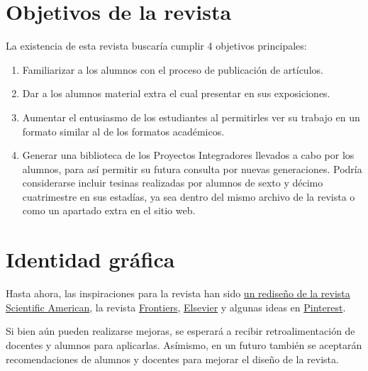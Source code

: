 \documentclass{Manual}
\begin{document}
    \frontmatter

\Portada
\Indice



    \mainmatter


\chapter{Objetivos de la revista}

La existencia de esta revista buscaría cumplir 4 objetivos principales:

\begin{enumerate}
    \item Familiarizar a los alumnos con el proceso de publicación de artículos.
    \item Dar a los alumnos material extra el cual presentar en sus exposiciones.
    \item Aumentar el entusiasmo de los estudiantes al permitirles ver su trabajo en un formato similar al de los formatos académicos.
    \item Generar una biblioteca de los Proyectos Integradores llevados a cabo por los alumnos, para así permitir su futura consulta por nuevas generaciones.
        \subitem Podría considerarse incluir tesinas realizadas por alumnos de sexto y décimo cuatrimestre en sus estadías, ya sea dentro del mismo archivo de la revista o como un apartado extra en el sitio web.
\end{enumerate}



\chapter{Identidad gráfica}

Hasta ahora, las inspiraciones para la revista han sido \href{https://www.pentagram.com/work/scientific-american?rel=sector&rel-id=3}{un rediseño de la revista Scientific American}, la revista \href{https://www.frontiersin.org/journals/sustainability/articles/10.3389/frsus.2026.1818134/pdf}{Frontiers}, \href{https://www.sciencedirect.com/science/article/pii/S1198743X26000650/pdfft?pid=1-s2.0-S1198743X26000650-main.pdf}{Elsevier} y algunas ideas en \href{https://pin.it/3s68QTUbZ}{Pinterest}.

Si bien aún pueden realizarse mejoras, se esperará a recibir retroalimentación de docentes y alumnos para aplicarlas. Asímismo, en un futuro también se aceptarán recomendaciones de alumnos y docentes para mejorar el diseño de la revista.
\end{document}
